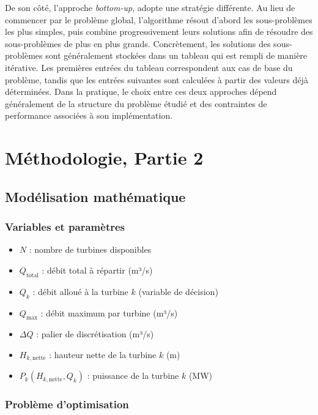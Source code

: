 \documentclass[12pt, letterpaper]{report}
\begin{document}
De son côté, l'approche \textit{bottom-up}, adopte une stratégie différente. Au lieu de commencer par le problème global, l’algorithme résout d’abord les sous-problèmes les plus simples, puis combine progressivement leurs solutions afin de résoudre des sous-problèmes de plus en plus grands.  Concrètement, les solutions des sous-problèmes sont généralement stockées dans un tableau qui est rempli de manière itérative. Les premières entrées du tableau correspondent aux cas de base du problème, tandis que les entrées suivantes sont calculées à partir des valeurs déjà déterminées.  Dans la pratique, le choix entre ces deux approches dépend généralement de la structure du problème étudié et des contraintes de performance associées à son implémentation.

\chapter{Méthodologie, Partie 2}

\section{Modélisation mathématique}
\subsection{Variables et paramètres}

\begin{itemize}
    \item $N$ : nombre de turbines disponibles
    \item $Q_{\text{total}}$ : débit total à répartir (m³/s)
    \item $Q_k$ : débit alloué à la turbine $k$ (variable de décision)
    \item $Q_{\max}$ : débit maximum par turbine (m³/s)
    \item $\Delta Q$ : palier de discrétisation (m³/s)
    \item $H_{k,\text{nette}}$ : hauteur nette de la turbine $k$ (m)
    \item $P_k(H_{k,\text{nette}}, Q_k)$ : puissance de la turbine $k$ (MW)
\end{itemize}

\subsection{Problème d'optimisation}
\end{document}
